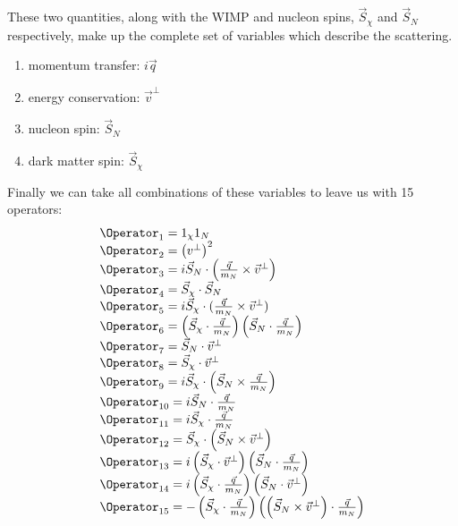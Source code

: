 \par
These two quantities, along with the WIMP and nucleon spins, $\vec{S}_\chi$ and $\vec{S}_N$ respectively, make up the complete set of variables which describe the scattering. 
\begin{enumerate}
    \item momentum transfer: $i\Vec{q}$
    \item energy conservation: $\Vec{v}^{\bot}$
    \item nucleon spin: $\Vec{S}_{N}$
    \item dark matter spin: $\Vec{S}_{\chi}$
\end{enumerate}

\par
Finally we can take all combinations of these variables to leave us with 15 operators:
\begin{equation}
\begin{array}{lcl}
\Operator_{1}=1_{\chi}1_N \\ 
\Operator_{2}=\left(v^{\perp}\right)^{2} \\
\Operator_{3}=i \vec{S}_{N} \cdot\left(\frac{\vec{q}}{m_N} \times \vec{v}^{\perp}\right) \\ 
\Operator_{4}=\vec{S}_{\chi} \cdot \vec{S}_{N} \\ 
\Operator_{5}=i \vec{S}_{\chi} \cdot(\frac{\vec{q}}{m_N} \times \vec{v}^{\perp}) \\ 
\Operator_{6}=\left(\vec{S}_{\chi} \cdot \frac{\vec{q}}{m_N}\right)\left(\vec{S}_{N} \cdot \frac{\vec{q}}{m_N}\right) \\
\Operator_{7}=\vec{S}_{N} \cdot \vec{v}^{\perp} \\
\Operator_{8}=\vec{S}_{\chi} \cdot \vec{v}^{\perp} \\ 
\Operator_{9}=i \vec{S}_{\chi} \cdot\left(\vec{S}_{N} \times \frac{\vec{q}}{m_N}\right) \\
\Operator_{10}=i \vec{S}_{N} \cdot \frac{\vec{q}}{m_N} \\ 
\Operator_{11}=i \vec{S}_{\chi} \cdot \frac{\vec{q}}{m_N} \\
\Operator_{12} =\vec{S}_{\chi} \cdot\left(\vec{S}_{N} \times \vec{v}^{\perp}\right) \\
\Operator_{13} =i\left(\vec{S}_{\chi} \cdot \vec{v}^{\perp}\right)\left(\vec{S}_{N} \cdot \frac{\vec{q}}{m_N}\right) \\ 
\Operator_{14} =i\left(\vec{S}_{\chi} \cdot \frac{\vec{q}}{m_N}\right)\left(\vec{S}_{N} \cdot \vec{v}^{\perp}\right) \\ 
\Operator_{15} =-\left(\vec{S}_{\chi} \cdot \frac{\vec{q}}{m_N}\right)\left(\left(\vec{S}_{N} \times \vec{v}^{\perp}\right) \cdot \frac{\vec{q}}{m_N}\right)
\end{array}
\label{eq:EFT_Operators}
\end{equation}


